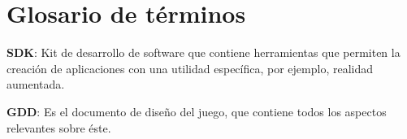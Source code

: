 \chapter{Glosario de términos}

\begin{description}
  \item \textbf{SDK}: Kit de desarrollo de software que contiene herramientas que permiten la creación de aplicaciones con una utilidad específica, por ejemplo, realidad aumentada.

  \item \textbf{GDD}: Es el documento de diseño del juego, que contiene todos los aspectos relevantes sobre éste.
\end{description}
